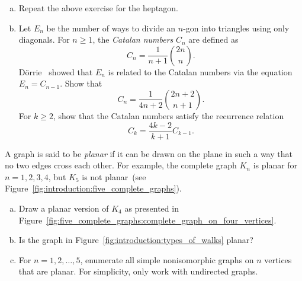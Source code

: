 \begin{problem}
\begin{enumerate}[(a)]
  \item Repeat the above exercise for the
    heptagon.

  \item Let $E_n$ be the number of ways to
    divide an $n$-gon
    into triangles using only diagonals. For $n \geq 1$, the
    \emph{Catalan numbers} $C_n$ are defined as
    \[
    C_n
    =
    \frac{1}{n+1} \binom{2n}{n}.
    \]
    D\"orrie~\cite[pp.21--27]{Dorrie1965}
    showed that $E_n$ is related to the Catalan
    numbers via the equation $E_n = C_{n-1}$. Show that
    \[
    C_n
    =
    \frac{1}{4n + 2} \binom{2n + 2}{n + 1}.
    \]
    For $k \geq 2$, show that the Catalan
    numbers satisfy the recurrence relation
    \[
    C_k
    =
    \frac{4k - 2}{k + 1} C_{k-1}.
    \]
  \end{enumerate}

\item A graph is said to be \emph{planar} if it can be drawn on the
  plane in such a way that no two edges cross each other. For example,
  the complete graph $K_n$ is planar for $n = 1, 2, 3, 4$, but $K_5$
  is not planar~(see
  Figure~\ref{fig:introduction:five_complete_graphs}).
  \begin{enumerate}[(a)]
  \item Draw a planar version of $K_4$ as presented in
    Figure~\ref{fig:five_complete_graphs:complete_graph_on_four_vertices}.

  \item Is the graph in Figure~\ref{fig:introduction:types_of_walks}
    planar?

  \item For $n = 1, 2, \dots, 5$, enumerate all simple nonisomorphic
    graphs on $n$ vertices that are planar. For simplicity, only work
    with undirected graphs.
  \end{enumerate}
\end{problem}
